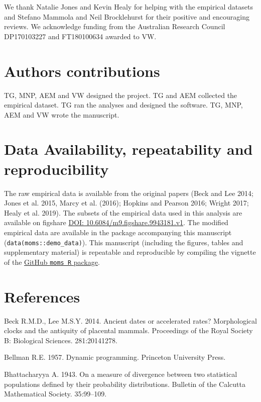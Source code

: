 \documentclass[]{article}
\begin{document}
We thank Natalie Jones and Kevin Healy for helping with the empirical
datasets and Stefano Mammola and Neil Brocklehurst for their positive
and encouraging reviews. We acknowledge funding from the Australian
Research Council DP170103227 and FT180100634 awarded to VW.

\section{Authors contributions}\label{authors-contributions}

TG, MNP, AEM and VW designed the project. TG and AEM collected the
empirical dataset. TG ran the analyses and designed the software. TG,
MNP, AEM and VW wrote the manuscript.

\section{Data Availability, repeatability and
reproducibility}\label{data-availability-repeatability-and-reproducibility}

The raw empirical data is available from the original papers (Beck and
Lee 2014; Jones et al. 2015, Marcy et al. (2016); Hopkins and Pearson
2016; Wright 2017; Healy et al. 2019). The subsets of the empirical data
used in this analysis are available on figshare
\href{https://doi.org/10.6084/m9.figshare.9943181.v1}{DOI:
10.6084/m9.figshare.9943181.v1}. The modified empirical data are
available in the package accompanying this manuscript
(\texttt{data(moms::demo\_data)}). This manuscript (including the
figures, tables and supplementary material) is repeatable and
reproducible by compiling the vignette of the
\href{https://github/TGuillerme/moms}{GitHub \texttt{moms\ R} package}.

\section*{References}\label{references}

\hypertarget{refs}{}
\hypertarget{ref-beck2014}{}
Beck R.M.D., Lee M.S.Y. 2014. Ancient dates or accelerated rates?
Morphological clocks and the antiquity of placental mammals. Proceedings
of the Royal Society B: Biological Sciences. 281:20141278.

\hypertarget{ref-cursedimensionality}{}
Bellman R.E. 1957. Dynamic programming. Princeton University Press.

\hypertarget{ref-bhattacharyya1943}{}
Bhattacharyya A. 1943. On a measure of divergence between two
statistical populations defined by their probability distributions.
Bulletin of the Calcutta Mathematical Society. 35:99--109.
\end{document}
